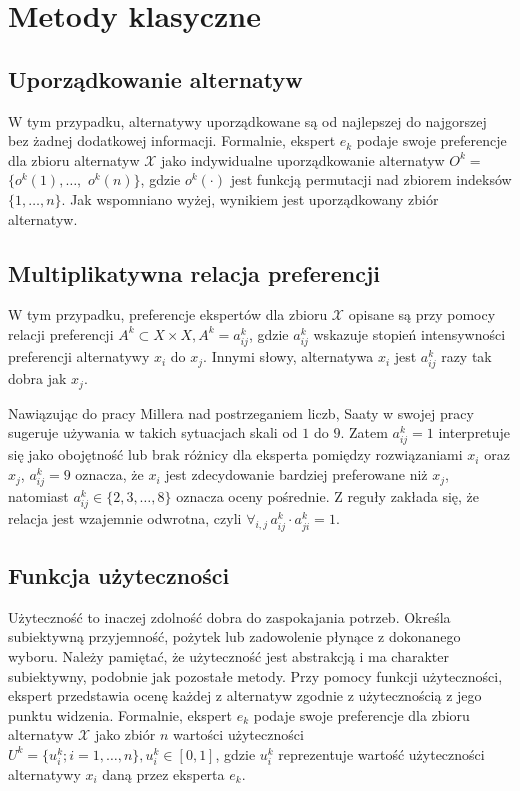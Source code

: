 \section{Metody klasyczne}

\subsection{Uporządkowanie alternatyw}

W tym przypadku, alternatywy uporządkowane są od najlepszej do najgorszej bez
żadnej dodatkowej informacji. Formalnie, ekspert $e_k$ podaje swoje preferencje
dla zbioru alternatyw $\mathcal{X}$ jako indywidualne uporządkowanie alternatyw
$ O^k =$ $\{o^k(1), \dotsc,$ $o^k(n)\}$, gdzie $o^k(\cdot)$ jest funkcją
permutacji nad zbiorem indeksów $\{1,\dotsc,n\}$. Jak wspomniano wyżej, wynikiem
jest uporządkowany zbiór alternatyw.

\subsection{Multiplikatywna relacja preferencji}
W tym przypadku, preferencje ekspertów dla zbioru $\mathcal{X}$ opisane są przy
pomocy relacji preferencji $A^k \subset X \times X, A^k = a^k_{ij}$, gdzie
$a^k_{ij}$ wskazuje stopień intensywności preferencji alternatywy $x_i$ do
$x_j$. Innymi słowy, alternatywa $x_i$ jest $a^k_{ij}$ razy tak dobra jak $x_j$.

Nawiązując do pracy Millera  nad postrzeganiem liczb, Saaty w swojej
pracy  sugeruje używania w takich sytuacjach skali od $1$ do $9$.
Zatem $a^k_{ij} = 1$ interpretuje się jako obojętność lub brak różnicy dla
eksperta pomiędzy rozwiązaniami $x_i$ oraz $x_j$, $a^k_{ij}=9$ oznacza, że $x_i$
jest zdecydowanie bardziej preferowane niż $x_j$, natomiast $a^k_{ij} \in \{
2,3, \dotsc, 8\}$ oznacza oceny pośrednie. Z reguły zakłada się, że relacja jest
wzajemnie odwrotna, czyli $\forall_{i,j} \, a^k_{ij} \cdot a^k_{ji} = 1$.

\subsection{Funkcja użyteczności}
Użyteczność to inaczej zdolność dobra do zaspokajania potrzeb. Określa
subiektywną przyjemność, pożytek lub zadowolenie płynące z dokonanego wyboru.
Należy pamiętać, że użyteczność jest abstrakcją i ma charakter subiektywny,
podobnie jak pozostałe metody. Przy pomocy funkcji użyteczności, ekspert
przedstawia ocenę każdej z alternatyw zgodnie z użytecznością z jego punktu
widzenia. Formalnie, ekspert $e_k$ podaje swoje preferencje dla zbioru
alternatyw $\mathcal{X}$ jako zbiór $n$ wartości użyteczności $U^k = \{u^k_i;
i=1,\dotsc,n\}, u^k_i \in [0,1]$, gdzie $u^k_i$ reprezentuje wartość
użyteczności alternatywy $x_i$ daną przez eksperta $e_k$.

